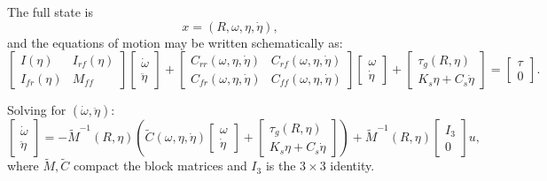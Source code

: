 \documentclass[12pt]{article}
\begin{document}
The full state is
\[
  x = (R,\omega,\eta,\dot{\eta}),
\]
and the equations of motion may be written schematically as:
\begin{equation}
  \begin{bmatrix}
    I(\eta) & I_{rf}(\eta) \\
    I_{fr}(\eta) & M_{ff}
  \end{bmatrix}
  \begin{bmatrix}
    \dot{\omega} \\[0.2em]
    \ddot{\eta}
  \end{bmatrix}
  +
  \begin{bmatrix}
    C_{rr}(\omega,\eta,\dot{\eta}) & C_{rf}(\omega,\eta,\dot{\eta}) \\
    C_{fr}(\omega,\eta,\dot{\eta}) & C_{ff}(\omega,\eta,\dot{\eta})
  \end{bmatrix}
  \begin{bmatrix}
    \omega \\[0.2em]
    \dot{\eta}
  \end{bmatrix}
  +
  \begin{bmatrix}
    \tau_g(R,\eta) \\[0.2em]
    K_s \eta + C_s \dot{\eta}
  \end{bmatrix}
  =
  \begin{bmatrix}
    \tau \\[0.2em]
    0
  \end{bmatrix}.
  \label{eq:3d_flex_block}
\end{equation}

Solving for \((\dot{\omega},\ddot{\eta})\):
\begin{equation}
  \begin{bmatrix}
    \dot{\omega} \\[0.2em]
    \ddot{\eta}
  \end{bmatrix}
  =
  -\tilde{M}^{-1}(R,\eta)
  \left(
    \tilde{C}(\omega,\eta,\dot{\eta})
    \begin{bmatrix}
      \omega \\ \dot{\eta}
    \end{bmatrix}
    + 
    \begin{bmatrix}
      \tau_g(R,\eta) \\ K_s \eta + C_s \dot{\eta}
    \end{bmatrix}
  \right)
  +
  \tilde{M}^{-1}(R,\eta)
  \begin{bmatrix}
    I_3 \\ 0
  \end{bmatrix} u,
\end{equation}
where \(\tilde{M},\tilde{C}\) compact the block matrices and \(I_3\) is the \(3\times3\) identity.
\end{document}
